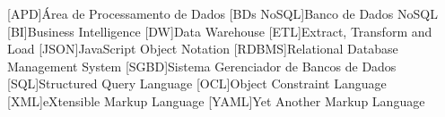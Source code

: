 \begin{acronym}[ACRONYM] 

[APD]{Área de Processamento de Dados}
[BDs NoSQL]{Banco de Dados NoSQL}
[BI]{Business Intelligence}
[DW]{Data Warehouse}
[ETL]{Extract, Transform and Load}
[JSON]{JavaScript Object Notation}
[RDBMS]{Relational Database Management System}
[SGBD]{Sistema Gerenciador de Bancos de Dados}
[SQL]{Structured Query Language}
[OCL]{Object Constraint Language}
[XML]{eXtensible Markup Language}
[YAML]{Yet Another Markup Language}



\end{acronym}
